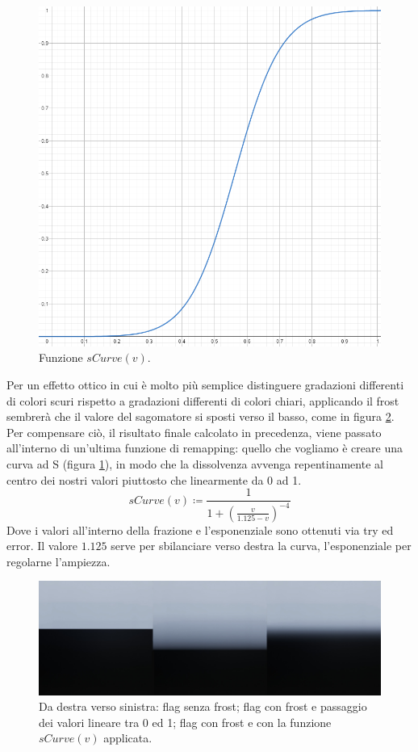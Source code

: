 \documentclass[main.tex]{subfiles}
\begin{document}
\begin{figure}
    \centering
    \captionsetup{justification=centering}
    \includegraphics[scale=0.35]{img/newFeatures/sCurve.png}
    \caption{Funzione $sCurve(v)$.}
    \label{fig:5_sCurve}
\end{figure}
Per un effetto ottico in cui è molto più semplice distinguere gradazioni differenti di colori scuri rispetto a gradazioni differenti di colori chiari, applicando il frost sembrerà che il valore del sagomatore si sposti verso il basso, come in figura \ref{fig:5_shaperFixes}. Per compensare ciò, il risultato finale calcolato in precedenza, viene passato all'interno di un'ultima funzione di remapping: quello che vogliamo è creare una curva ad S (figura \ref{fig:5_sCurve}), in modo che la dissolvenza avvenga repentinamente al centro dei nostri valori piuttosto che linearmente da 0 ad 1.
\[sCurve(v) \coloneqq \frac{1}{1 + (\frac{v}{1.125 - v})^{-4}}\]
Dove i valori all'interno della frazione e l'esponenziale sono ottenuti via try ed error. Il valore $1.125$ serve per sbilanciare verso destra la curva, l'esponenziale per regolarne l'ampiezza.
\begin{figure}[H]
    \centering
    \includegraphics[width=1\linewidth]{img/newFeatures/shaperFixes.jpg}
    \caption{Da destra verso sinistra: flag senza frost; flag con frost e passaggio dei valori lineare tra 0 ed 1; flag con frost e con la funzione $sCurve(v)$ applicata.}
    \label{fig:5_shaperFixes}
\end{figure}
\end{document}
